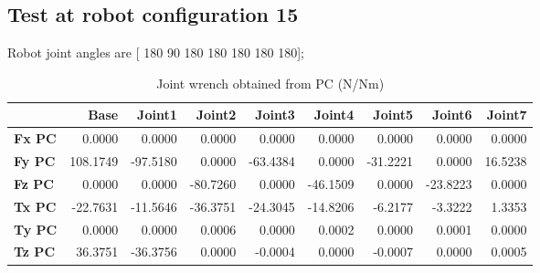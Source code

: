 
\subsection{Test at robot configuration 15}
Robot joint angles are  [ 180   90  180  180  180  180  180];

\begin{table}[h!]
	\centering
	\caption{Joint wrench obtained from PC (N/Nm)}
	\label{wrech_PC_Pose15}
	\begin{tabular}{|l|r|r|r|r|r|r|r|r|}
		\hline
		\textbf{}  & \textbf{Base} & \textbf{Joint1}  & \textbf{Joint2}  & \textbf{Joint3}  & \textbf{Joint4}  & \textbf{Joint5}  & \textbf{Joint6}  & \textbf{Joint7} \\ \hline
		\textbf{Fx PC}  & 0.0000        & 0.0000        & 0.0000        & 0.0000        & 0.0000        & 0.0000        & 0.0000        & 0.0000 \\ \hline
		\textbf{Fy PC}  & 108.1749        & -97.5180        & 0.0000        & -63.4384        & 0.0000        & -31.2221        & 0.0000        & 16.5238 \\ \hline
		\textbf{Fz PC}  & 0.0000        & 0.0000        & -80.7260        & 0.0000        & -46.1509        & 0.0000        & -23.8223        & 0.0000 \\ \hline
		\textbf{Tx PC}  & -22.7631        & -11.5646        & -36.3751        & -24.3045        & -14.8206        & -6.2177        & -3.3222        & 1.3353 \\ \hline
		\textbf{Ty PC}  & 0.0000        & 0.0000        & 0.0006        & 0.0000        & 0.0002        & 0.0000        & 0.0001        & 0.0000 \\ \hline
		\textbf{Tz PC}  & 36.3751        & -36.3756        & 0.0000        & -0.0004        & 0.0000        & -0.0007        & 0.0000        & 0.0005 \\ \hline
	\end{tabular}
\end{table}

